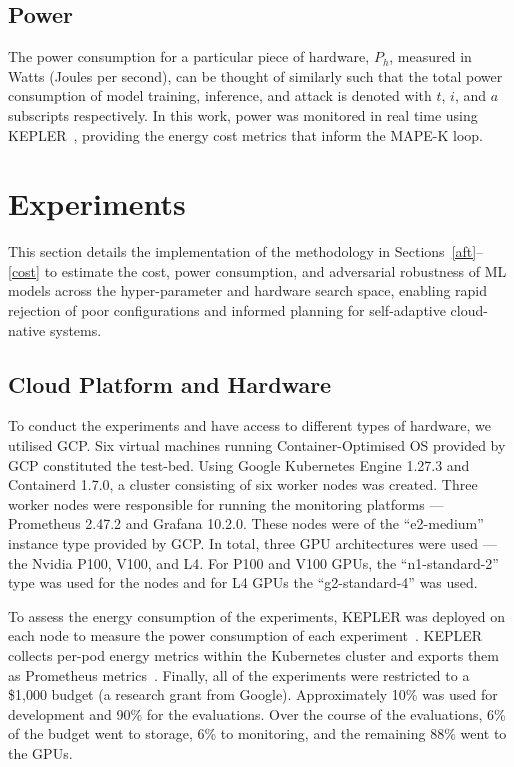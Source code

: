 \documentclass[conference]{IEEEtran}%
\begin{document}
\subsection{Power}

The power consumption for a particular piece of hardware, $P_h$, measured in Watts (Joules per second), can be thought of similarly such that the total power consumption of model training, inference, and attack is denoted with $t$, $i$, and $a$ subscripts respectively. 
In this work, power was monitored in real time using KEPLER~\cite{amaral2023kepler}, providing the energy cost metrics that inform the MAPE-K loop.


\section{Experiments}
\label{experiments}

This section details the implementation of the methodology in Sections~\ref{aft}--\ref{cost} to estimate the cost, power consumption, and adversarial robustness of ML models across the hyper-parameter and hardware search space, enabling rapid rejection of poor configurations and informed planning for self-adaptive cloud-native systems.

\subsection{Cloud Platform and Hardware}
To conduct the experiments and have access to different types of hardware, we utilised GCP\@.
Six virtual machines running Container-Optimised OS provided by GCP constituted the test-bed.
Using Google Kubernetes Engine 1.27.3 and Containerd 1.7.0, a cluster consisting of six worker nodes was created.
Three worker nodes were responsible for running the monitoring platforms --- Prometheus 2.47.2 and Grafana 10.2.0.
These nodes were of the ``e2-medium'' instance type provided by GCP\@.
In total, three GPU architectures were used --- the Nvidia P100, V100, and L4\@.
For P100 and V100 GPUs, the ``n1-standard-2'' type was used for the nodes and for L4 GPUs the ``g2-standard-4'' was used.

To assess the energy consumption of the experiments, KEPLER was deployed on each node to measure the power consumption of each experiment~\cite{amaral2023kepler}.
KEPLER collects per-pod energy metrics within the Kubernetes cluster and exports them as Prometheus metrics~\cite{sedghpour@ebpf}. 
Finally, all of the experiments were restricted to a \$1,000 budget (a research grant from Google). 
Approximately 10\% was used for development and 90\% for the evaluations.
Over the course of the evaluations, 6\% of the budget went to storage, 6\% to monitoring, and the remaining 88\% went to the GPUs.
\end{document}
